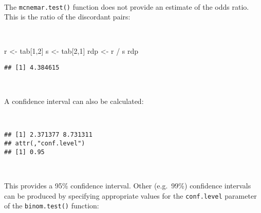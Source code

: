 \documentclass[
  12pt,
  a4paper]{book}
\newenvironment{Shaded}{\begin{snugshade}}{\end{snugshade}}
\newcommand{\AttributeTok}[1]{\textcolor[rgb]{0.77,0.63,0.00}{#1}}
\newcommand{\DecValTok}[1]{\textcolor[rgb]{0.00,0.00,0.81}{#1}}
\newcommand{\FloatTok}[1]{\textcolor[rgb]{0.00,0.00,0.81}{#1}}
\newcommand{\FunctionTok}[1]{\textcolor[rgb]{0.00,0.00,0.00}{#1}}
\newcommand{\NormalTok}[1]{#1}
\newcommand{\OtherTok}[1]{\textcolor[rgb]{0.56,0.35,0.01}{#1}}
\newcommand{\SpecialCharTok}[1]{\textcolor[rgb]{0.00,0.00,0.00}{#1}}
\begin{document}
~

The \texttt{mcnemar.test()} function does not provide an estimate of the odds ratio. This is the ratio of the discordant pairs:

~

\begin{Shaded}
\begin{Highlighting}[]
\NormalTok{r }\OtherTok{\textless{}{-}}\NormalTok{ tab[}\DecValTok{1}\NormalTok{,}\DecValTok{2}\NormalTok{]}
\NormalTok{s }\OtherTok{\textless{}{-}}\NormalTok{ tab[}\DecValTok{2}\NormalTok{,}\DecValTok{1}\NormalTok{]}
\NormalTok{rdp }\OtherTok{\textless{}{-}}\NormalTok{ r }\SpecialCharTok{/}\NormalTok{ s}
\NormalTok{rdp}
\end{Highlighting}
\end{Shaded}

\begin{verbatim}
## [1] 4.384615
\end{verbatim}

~

A confidence interval can also be calculated:

~

\begin{Shaded}
\end{Shaded}

\begin{verbatim}
## [1] 2.371377 8.731311
## attr(,"conf.level")
## [1] 0.95
\end{verbatim}

~

This provides a 95\% confidence interval. Other (e.g.~99\%) confidence intervals can be produced by specifying appropriate values for the \texttt{conf.level} parameter of the \texttt{binom.test()} function:

~

\begin{Shaded}
\end{Shaded}
\end{document}
